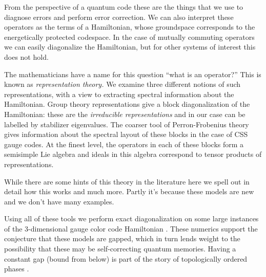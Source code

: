 From the perspective of a quantum code these are the
things that we use to diagnose errors and perform error correction.
We can also interpret these operators as the terms of a Hamiltonian, whose
groundspace corresponds to the energetically protected codespace.
In the case of mutually commuting operators we can easily diagonalize the
Hamiltonian, but for other systems of interest this does not hold.

The mathematicians have a name for this question ``what is an operator?''
This is known as \emph{representation theory.}
We examine three different notions of
such representations, with a view to extracting
spectral information about the Hamiltonian.
Group theory representations give 
a block diagonalization of the Hamiltonian:
these are the \emph{irreducible representations} and in
our case can be labelled by stabilizer eigenvalues.
The coarser tool of Perron-Frobenius theory \cite{Perron1907, Frobenius1912, Baez2012}
gives information about the
spectral layout of these blocks in the case of CSS gauge codes.
At the finest level, the operators in each of these blocks form a semisimple Lie
algebra and ideals in this algebra correspond to tensor products of
representations. 

While there are
some hints of this theory in the literature 
\cite{Bacon2006quantum,Yoshida2010} %
here we spell out in detail how this works and much more.
Partly it's because these models are new and we don't have
many examples.

Using all of these tools we 
perform exact diagonalization on some 
large instances of the 3-dimensional gauge color code 
Hamiltonian \cite{Bombin2015,Bombin2015single,Kubica2015}.
These numerics support the conjecture that these models are gapped,
which in turn lends weight to the possibility that these may
be self-correcting quantum memories.
Having a constant gap (bound from below)
is part of the story of topologically ordered phases
\cite{Kitaev2003,Brown2016}.




